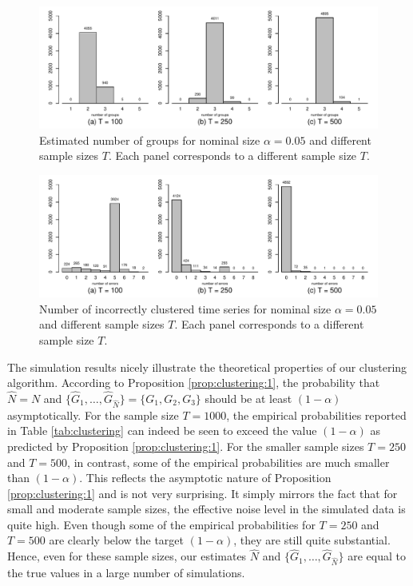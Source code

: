 \documentclass[a4paper,12pt]{article}
\begin{document}
\begin{figure}[h!]
\centering
\includegraphics[width=\textwidth]{output/plots/sim/histograms_groups}
\caption{Estimated number of groups for nominal size $\alpha = 0.05$ and different sample sizes $T$. Each panel corresponds to a different sample size $T$.}
\label{fig:clustering:1}
\end{figure}

\begin{figure}[h!]
\centering
\includegraphics[width=\textwidth]{output/plots/sim/histograms_errors}
\caption{Number of incorrectly clustered time series for nominal size $\alpha = 0.05$ and different sample sizes $T$. Each panel corresponds to a different sample size $T$.}\label{fig:clustering:2}
\end{figure}




The simulation results nicely illustrate the theoretical properties of our clustering algorithm. According to Proposition \ref{prop:clustering:1}, the probability that $\widehat{N} = N$ and $\{ \widehat{G}_1,\ldots,\widehat{G}_{\widehat{N}}\} = \{G_1,G_2,G_3\}$ should be at least $(1-\alpha)$ asymptotically. For the sample size $T = 1000$, the empirical probabilities reported in Table \ref{tab:clustering} can indeed be seen to exceed the value $(1-\alpha)$ as predicted by Proposition \ref{prop:clustering:1}. %
For the smaller sample sizes $T=250$ and $T=500$, in contrast, some of the empirical probabilities are much smaller than $(1-\alpha)$. This reflects the asymptotic nature of Proposition \ref{prop:clustering:1} and is not very surprising. It simply mirrors the fact that for small and moderate sample sizes, the effective noise level in the simulated data is quite high. Even though some of the empirical probabilities for $T=250$ and $T=500$ are clearly below the target $(1-\alpha)$, they are still quite substantial. Hence, even for these sample sizes, our estimates $\widehat{N}$ and $\{ \widehat{G}_1,\ldots,\widehat{G}_{\widehat{N}} \}$ are equal to the true values in a large number of simulations. 
%
\end{document}
